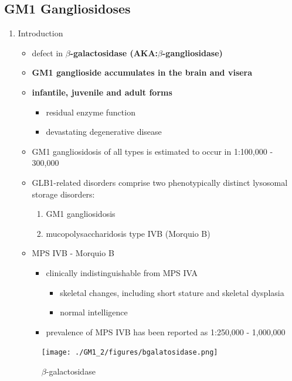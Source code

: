 \documentclass{scrartcl}
\begin{document}
\subsection{GM1 Gangliosidoses}
\label{sec:org0d7b689}
\begin{enumerate}
\item Introduction
\label{sec:orgf65f1ff}

\begin{itemize}
\item defect in \textbf{\(\beta\)-galactosidase (AKA:\(\beta\)-gangliosidase)}
\item \textbf{GM1 ganglioside accumulates in the brain and visera}
\item \textbf{infantile, juvenile and adult forms}
\begin{itemize}
\item residual enzyme function
\item devastating degenerative disease
\end{itemize}
\item GM1 gangliosidosis of all types is estimated to occur in 1:100,000 - 300,000

\item GLB1-related disorders comprise two phenotypically distinct lysosomal storage disorders:
\begin{enumerate}
\item GM1 gangliosidosis
\item mucopolysaccharidosis type IVB (Morquio B)
\end{enumerate}

\item MPS IVB - Morquio B
\begin{itemize}
\item clinically indistinguishable from MPS IVA 
\begin{itemize}
\item skeletal changes, including short stature and skeletal dysplasia
\item normal intelligence
\end{itemize}
\item prevalence of MPS IVB has been reported as 1:250,000 - 1,000,000
\end{itemize}
\end{itemize}

\begin{figure}[htbp]
\centering
\texttt{[image: ./GM1\_2/figures/bgalatosidase.png]}
\caption{\label{fig:org94f830b}
\(\beta\)-galactosidase}
\end{figure}



\end{enumerate}
\end{document}
